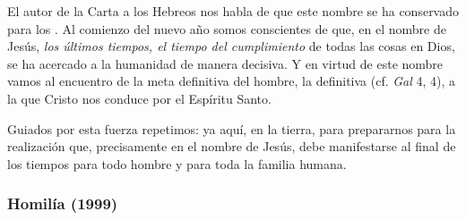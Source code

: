 \begin{body}
	El autor de la Carta a los Hebreos nos habla de que este nombre se ha conservado para los . Al comienzo del nuevo año somos conscientes de que, en el nombre de Jesús, \emph{los últimos tiempos, el tiempo del cumplimiento} de todas las cosas en Dios, se ha acercado a la humanidad de manera decisiva. Y en virtud de este nombre vamos al encuentro de la meta definitiva del hombre, la definitiva  (cf. \emph{Gal} 4, 4), a la que Cristo nos conduce por el Espíritu Santo.
	
	Guiados por esta fuerza repetimos:  ya aquí, en la tierra, para prepararnos para la realización que, precisamente en el nombre de Jesús, debe manifestarse al final de los tiempos para todo hombre y para toda la familia humana.
\end{body}

\subsubsection{Homilía (1999)}


